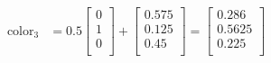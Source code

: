 \begin{align*}
    \textrm{color}_3 &= 0.5 \begin{bmatrix}
        0 \\
        1 \\
        0 \\
    \end{bmatrix} + \begin{bmatrix}
        0.575 \\
        0.125 \\
        0.45 \\
    \end{bmatrix} = \begin{bmatrix}
        0.286 \\
        0.5625 \\
        0.225 \\ 
    \end{bmatrix}
\end{align*}